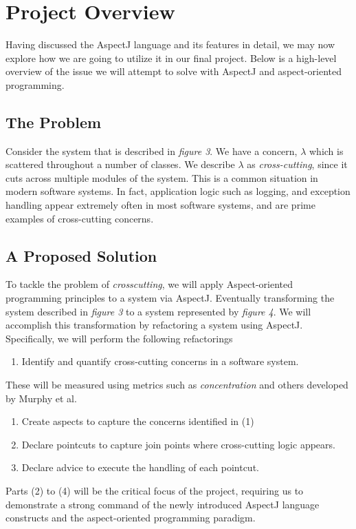 \documentclass[sigconf]{acmart}
\begin{document}
 \section{Project Overview}
 Having discussed the AspectJ language and its features in detail, we may now explore how we are going to utilize it in our final project. Below is a high-level overview of the issue we will attempt to solve with AspectJ and aspect-oriented programming.
 \subsection{The Problem}
 Consider the system that is described in \textit{figure 3}. We have a concern, $\lambda$ which is scattered throughout a number of classes. We describe $\lambda$ as \textit{cross-cutting}, since it cuts across multiple modules of the system. This is a common situation in modern software systems. In fact, application logic such as logging, and exception handling \cite{aop-ECCOP} appear extremely often in most software systems, and are prime examples of cross-cutting concerns.

\subsection{A Proposed Solution}
To tackle the problem of \textit{crosscutting}, we will apply Aspect-oriented programming principles to a system via AspectJ. Eventually transforming the system described in \textit{figure 3} to a system represented by \textit{figure 4}. We will accomplish this transformation by refactoring a system using AspectJ. Specifically, we will perform the following refactorings
\begin{enumerate}
    \item Identify and quantify cross-cutting concerns in a software system.
\end{enumerate}
These will be measured using metrics such as \textit{concentration} \cite{murphy} and others developed by Murphy et al.
\begin{enumerate}[resume]
    \item Create aspects to capture the concerns identified in (1)
    \item Declare pointcuts to capture join points where cross-cutting logic appears.
    \item Declare advice to execute the handling of each pointcut.
\end{enumerate}
Parts (2) to (4) will be the critical focus of the project, requiring us to demonstrate a strong command of the newly introduced AspectJ language constructs and the aspect-oriented programming paradigm.
\end{document}
